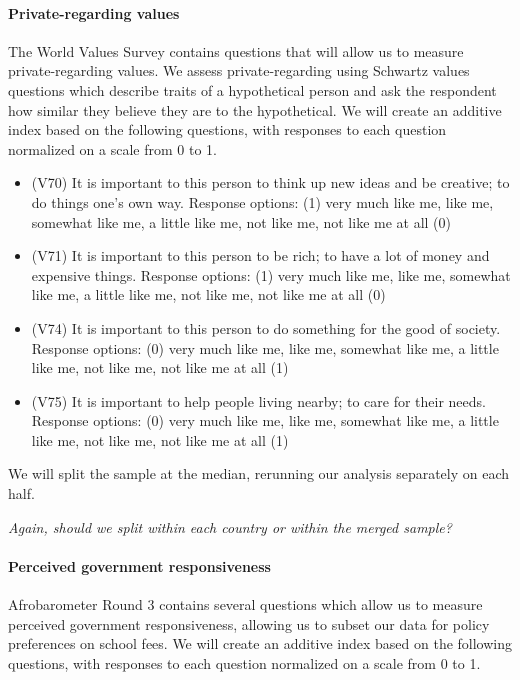 \documentclass[]{article}
\let\oldparagraph\paragraph
\renewcommand{\paragraph}[1]{\oldparagraph{#1}\mbox{}}
\begin{document}
\paragraph{Private-regarding values}\label{private-regarding-values}

The World Values Survey contains questions that will allow us to measure
private-regarding values. We assess private-regarding using Schwartz
values questions which describe traits of a hypothetical person and ask
the respondent how similar they believe they are to the hypothetical. We
will create an additive index based on the following questions, with
responses to each question normalized on a scale from 0 to 1.

\begin{itemize}
  \item (V70) It is important to this person to think up new ideas and be creative; to do things one’s own way. Response options: (1) very much like me, like me, somewhat like me, a little like me, not like me, not like me at all (0)
  \item (V71) It is important to this person to be rich; to have a lot of money and expensive things. Response options: (1) very much like me, like me, somewhat like me, a little like me, not like me, not like me at all (0)
  \item (V74) It is important to this person to do something for the good of society. Response options: (0) very much like me, like me, somewhat like me, a little like me, not like me, not like me at all (1)
  \item (V75) It is important to help people living nearby; to care for their needs. Response options: (0) very much like me, like me, somewhat like me, a little like me, not like me, not like me at all (1)
\end{itemize}

We will split the sample at the median, rerunning our analysis
separately on each half.

\textit{Again, should we split within each country or within the merged sample?}

\paragraph{Perceived government
responsiveness}\label{perceived-government-responsiveness}

Afrobarometer Round 3 contains several questions which allow us to
measure perceived government responsiveness, allowing us to subset our
data for policy preferences on school fees. We will create an additive
index based on the following questions, with responses to each question
normalized on a scale from 0 to 1.
\end{document}
